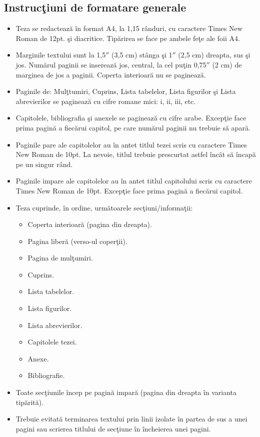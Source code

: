 \subsection*{Instruc\c{t}iuni de formatare generale}
\begin{itemize}
  \item Teza se redacteaz\u{a} \^{i}n format A4, la 1,15 r\^{a}nduri, cu caractere Times New Roman de 12pt. \c{s}i diacritice. Tip\u{a}rirea se face pe ambele fe\c{t}e ale foii A4.
  \item Marginile textului sunt la 1,5$''$ (3,5 cm) st\^{a}nga \c{s}i 1$''$ (2,5 cm) dreapta, sus \c{s}i jos. Num\u{a}rul paginii se insereaz\u{a} jos, central, la cel pu\c{t}in 0,75$''$ (2 cm) de marginea de jos a paginii. Coperta interioar\u{a} nu se pagineaz\u{a}.
  \item Paginile de: Mul\c{t}tumiri, Cuprins, Lista tabelelor, Lista figurilor şi Lista abrevierilor se pagineaz\u{a} cu cifre romane mici: i, ii, iii, etc.
  \item Capitolele, bibliografia \c{s}i anexele se pagineaz\u{a} cu cifre arabe. Excep\c{t}ie face prima pagin\u{a} a fiec\u{a}rui capitol, pe care num\u{a}rul paginii nu trebuie să apar\u{a}.
  \item Paginile pare ale capitolelor au în antet titlul tezei scris cu caractere Times New Roman de 10pt. La nevoie, titlul trebuie prescurtat astfel \^{i}nc\^{a}t s\u{a} \^{i}ncap\u{a} pe un singur r\^{a}nd.
  \item Paginile impare ale capitolelor au \^{i}n antet titlul capitolului scris cu caractere Times New Roman de 10pt. Excep\c{t}ie face prima pagin\u{a} a fiec\u{a}rui capitol.
  \item Teza cuprinde, \^{i}n ordine, urm\u{a}toarele sec\c{t}iuni/informa\c{t}ii:
  \begin{itemize}
  \item Coperta interioar\u{a} (pagina din dreapta).
  \item Pagina liber\u{a} (verso-ul coper\c{t}ii).
  \item Pagina de mul\c{t}umiri.
  \item Cuprins.
  \item Lista tabelelor.
  \item Lista figurilor.
  \item Lista abrevierilor.
  \item Capitolele tezei.
  \item Anexe.
  \item Bibliografie.
  \end{itemize}
  \item Toate sec\c{t}iunile \^{i}ncep pe pagin\u{a} impar\u{a} (pagina din dreapta \^{i}n varianta tip\u{a}rit\u{a}). 
  \item Trebuie evitat\u{a} terminarea textului prin linii izolate în partea de sus a unei pagini sau scrierea titlului de sec\c{t}iune \^{i}n \^{i}ncheierea unei pagini. 
  \end{itemize}
 
